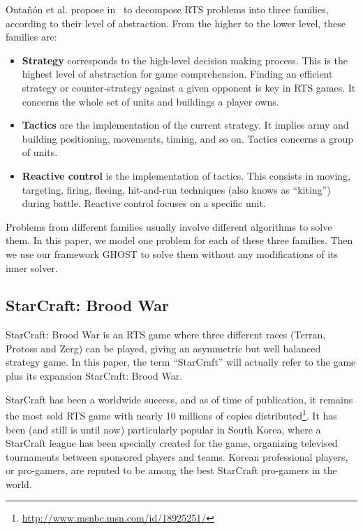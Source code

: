 \documentclass[journal]{IEEEtran}
\newcommand{\ghost}{\textsc{GHOST}\xspace}
\begin{document}
Onta{\~n}{\'o}n et  al. propose in~\cite{OntanonSURCM13}  to decompose
RTS  problems  into  three  families,  according  to  their  level  of
abstraction. From  the higher to  the lower level, these  families are:
\begin{itemize}
\item {\bf  Strategy} corresponds  to the high-level  decision making
  process.   This is  the highest  level of  abstraction for game
  comprehension.   Finding an  efficient strategy  or counter-strategy
  against a given opponent is key  in RTS games. It concerns the whole
  set of units and buildings a player owns.
\item {\bf Tactics}  are the implementation of  the current strategy.
  It implies army and building  positioning, movements, timing, and so
  on. Tactics concerns a group of units.
\item {\bf Reactive  control} is the implementation  of tactics. This
  consists   in  moving,   targeting,  firing,   fleeing,  hit-and-run
  techniques  (also  knows  as ``kiting'')  during  battle.   Reactive
  control focuses on a specific unit.
\end{itemize}
Problems from different families  usually involve different algorithms
to solve them.  In  this paper, we model one  problem for each of
these three families. Then we use our framework \ghost to  solve them without
any modifications  of its inner  solver. 

\subsection{StarCraft: Brood War}

StarCraft:  Brood War  is 
an  RTS game where
three  different  races (Terran, Protoss and Zerg)  can be played,
giving an  asymmetric but well balanced strategy  game.  In
this paper,  the term  ``StarCraft'' will actually  refer to  the game
plus its expansion StarCraft: Brood War.

StarCraft has  been a worldwide  success, and as of time of
publication, it remains the most sold RTS game 
with nearly 10 millions of copies distributed\footnote{\url{http://www.msnbc.msn.com/id/18925251/}}. It has
been  (and  still is until now)  particularly  popular  in  South Korea,  where  a
StarCraft league has  been specially created for  the game, organizing
televised  tournaments between  sponsored players  and teams.   Korean
professional players, or pro-gamers, are  reputed to be among the best
StarCraft pro-gamers in the world.
\end{document}
